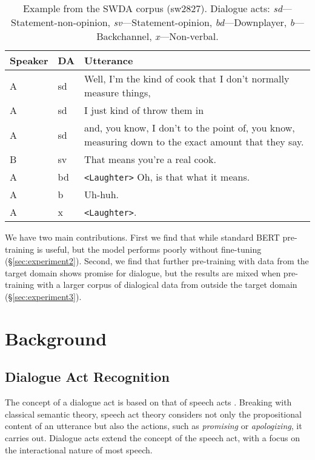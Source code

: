 \documentclass[11pt,a4paper]{article}
\begin{document}
\begin{table}
      \small
  \centering
  \begin{tabularx}{\linewidth}{llL}
    \toprule
    Speaker & DA & Utterance \\ \midrule
    A	&sd	& Well, I'm the kind of cook that I don't normally measure things,  \\
    A	&sd	& I just kind of throw them in \\
    A	&sd	& and, you know, I don't to the point of, you know, measuring down to the exact amount that they say.  \\
    B	&sv	& That means you're a real cook. \\
    A	&bd	& \texttt{<Laughter>} Oh, is that what it means.  \\
    A	&b	& Uh-huh.  \\
    A	&x	& \texttt{<Laughter>}.\\
             \bottomrule
  \end{tabularx}
  \caption{Example from the SWDA corpus (sw2827). Dialogue acts: \emph{sd}---Statement-non-opinion, \emph{sv}---Statement-opinion, \emph{bd}---Downplayer, \emph{b}---Backchannel, \emph{x}---Non-verbal. }
  \label{tab:example}
\end{table}

We have two main contributions.
First we find that while standard BERT pre-training is useful,
but the model performs poorly without fine-tuning (\S\ref{sec:experiment2}).
Second, we find that further pre-training with data from the target domain shows promise for dialogue, 
but the results are mixed when pre-training with a larger corpus of dialogical data from outside the target domain (\S\ref{sec:experiment3}).

\section{Background}

\subsection{Dialogue Act Recognition}
The concept of a dialogue act is based on that of speech acts \citep{austinHowThingsWords2009}.
Breaking with classical semantic theory, speech act theory considers not only the propositional content of an utterance but also the actions, such as \emph{promising} or \emph{apologizing}, it carries out.
Dialogue acts extend the concept of the speech act, 
with a focus on the interactional nature of most speech.
\end{document}
